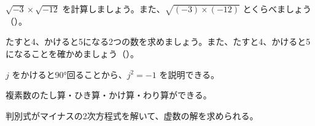 \bkproblem $\sqrt{-3}\times\sqrt{-12}$ を計算しましょう。また、$\sqrt{(-3)\times(-12)}$ とくらべましょう\mbox{（）}。

\bkproblem たすと4、かけると5になる2つの数を求めましょう。また、たすと4、かけると5になることを確かめましょう\mbox{（）}。

\begin{furikaeri}
\begin{checklist}
\item $j$ をかけると90°回ることから、$j^2=-1$ を説明できる。
\item 複素数のたし算・ひき算・かけ算・わり算ができる。
\item 判別式がマイナスの2次方程式を解いて、虚数の解を求められる。
\end{checklist}
\end{furikaeri}

